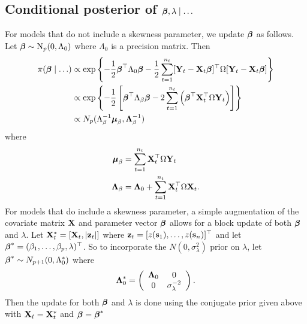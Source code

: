 \subsection*{Conditional posterior of $\mbox{\boldmath $\beta$}, \lambda \mid \ldots$}\label{sts:betapost}
For models that do not include a skewness parameter, we update $\mbox{\boldmath $\beta$}$ as follows.
Let $\mbox{\boldmath $\beta$} \sim \mbox{N}_{p}(0, \Lambda_0)$ where $\Lambda_0$ is a precision matrix.
Then
\begin{align*}
    \pi(\mbox{\boldmath $\beta$} \mid \ldots) & \propto \exp \left\{ - \frac{ 1 }{ 2 } \mbox{\boldmath $\beta$}^\top \Lambda_0 \mbox{\boldmath $\beta$} - \frac{ 1 }{ 2 } \sum_{t = 1}^{n_t} [\mathbf{Y}_t -\mathbf{X}_t \mbox{\boldmath $\beta$}]^\top \Omega [\mathbf{Y}_t - \mathbf{X}_t \mbox{\boldmath $\beta$}] \right\} \\
     & \propto \exp \left\{ -\frac{ 1 }{ 2 } \left[ \mbox{\boldmath $\beta$}^\top \Lambda_\beta \mbox{\boldmath $\beta$}  - 2 \sum_{t = 1}^{n_t} \left(\mbox{\boldmath $\beta$}^\top \mathbf{X}_t^\top \Omega \mathbf{Y}_t \right) \right] \right\} \\
     & \propto N_p ( \Lambda_\beta^{-1} \mbox{\boldmath $\mu$}_\beta , \mbox{\boldmath $\Lambda$}_\beta^{-1})
\end{align*}
where
\begin{align*}
    \mbox{\boldmath $\mu$}_\beta &= \sum_{t = 1}^{n_t} \mathbf{X}_t^\top \Omega \mathbf{Y}_t \\
    \mbox{\boldmath $\Lambda$}_\beta &= \mbox{\boldmath $\Lambda$}_0 + \sum_{t = 1}^{n_t} \mathbf{X}_t^\top \Omega \mathbf{X}_t.
\end{align*}
For models that do include a skewness parameter, a simple augmentation of the covariate matrix $\mathbf{X}$ and parameter vector $\mbox{\boldmath $\beta$}$ allows for a block update of both $\mbox{\boldmath $\beta$}$ and $\lambda$.
Let $\mathbf{X}^*_{t} = [\mathbf{X}_t, |\mathbf{z}_{t}|]$ where $\mathbf{z}_t = [z(\mathbf{s}_1), \ldots, z(\mathbf{s}_{n})]^\top$ and let $\mbox{\boldmath $\beta$}^* = (\beta_1, \ldots, \beta_p, \lambda)^\top$.
So to incorporate the $N(0, \sigma^2_\lambda)$ prior on $\lambda$, let $\mbox{\boldmath $\beta$}^* \sim N_{p+1}(0, \Lambda^*_0)$ where
\begin{align*}
  \mbox{\boldmath $\Lambda$}^*_0 = \left( \begin{array}{cc}
    \mbox{\boldmath $\Lambda$}_0 & 0 \\
    0         & \sigma^{-2}_\lambda
  \end{array}\right).
\end{align*}
Then the update for both $\mbox{\boldmath $\beta$}$ and $\lambda$ is done using the conjugate prior given above with $\mathbf{X}_t = \mathbf{X}_t^*$ and $\mbox{\boldmath $\beta$} = \mbox{\boldmath $\beta$}^*$

